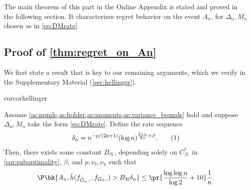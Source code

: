 \documentclass[12pt, reqno]{amsart}
\newcommand\numberthis{\addtocounter{equation}{1}\tag{\theequation}}
\newcommand{\fs}[1]{f_{#1, \boldsymbol{\cdot}}}
\newcommand{\barh}{\bar h}
\newcommand{\Hyperparams}{\mathcal{H}}
\numberwithin{equation}{section}
\begin{document}
\begin{refsection}
\begin{appendices}
The main theorem of this part in the Online Appendix is stated and proved in
the following section. It characterizes regret behavior on the event $A_n$,
for $\Delta_n, M_n$ chosen as in \eqref{eq:DMrate}.


\subsection{Proof of \cref{thm:regret_on_An}}

We first state a result that is key to our remaining arguments, which we verify in the
Supplementary Material (\cref{sec:hellinger}).

\begin{restatable}{cor}{corhellinger}
\label{cor:hellinger_large_dev}

Assume \cref{as:npmle,as:holder,as:moments,as:variance_bounds} hold and suppose $\Delta_n,
M_n$ take the form \eqref{eq:DMrate}. Define the rate sequence \[\delta_n = n^{-p/(2p+1)}
(\log n)^{\frac{2 + \alpha}{2 \alpha}
+
\beta}.\numberthis\label{eq:delta_rate_def}\]
Then, there exists some constant $B_{\Hyperparams}$, depending solely on
$C^*_\Hyperparams$ in \cref{cor:suboptimality}, $\beta$, and $p, \nu_\ell,
\nu_u$ such that
\[
\P\bk{
    A_n, \barh(\fs{\hat G_n}, \fs{G_0}) > B_\Hyperparams \delta_n } \le \pr{\frac{\log
    \log n}{\log 2} + 10}\frac{1}{n}.
\]
\end{restatable}


\thmregretonAn*


\end{appendices}
\end{refsection}
\end{document}
